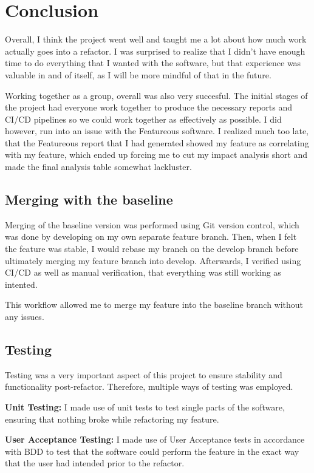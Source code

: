 \section{Conclusion}
Overall, I think the project went well and taught me a lot about how much work actually goes into a refactor. I was surprised to realize that I didn't have enough time to do everything that I wanted with the software, but that experience was valuable in and of itself, as I will be more mindful of that in the future.

Working together as a group, overall was also very succesful. The initial stages of the project had everyone work together to produce the necessary reports and CI/CD pipelines so we could work together as effectively as possible.
I did however, run into an issue with the Featureous software. I realized much too late, that the Featureous report that I had generated showed my feature as correlating with my feature, which ended up forcing me to cut my impact analysis short and made the final analysis table somewhat lackluster.
\subsection{Merging with the baseline}
Merging of the baseline version was performed using Git version control, which was done by developing on my own separate feature branch. Then, when I felt the feature was stable, I would rebase my branch on the develop branch before ultimately merging my feature branch into develop. Afterwards, I verified using CI/CD as well as manual verification, that everything was still working as intented.

This workflow allowed me to merge my feature into the baseline branch without any issues.

\subsection{Testing}
Testing was a very important aspect of this project to ensure stability and functionality post-refactor. Therefore, multiple ways of testing was employed.

\textbf{Unit Testing:} I made use of unit tests to test single parts of the software, ensuring that nothing broke while refactoring my feature.

\textbf{User Acceptance Testing:} I made use of User Acceptance tests in accordance with BDD to test that the software could perform the feature in the exact way that the user had intended prior to the refactor.

